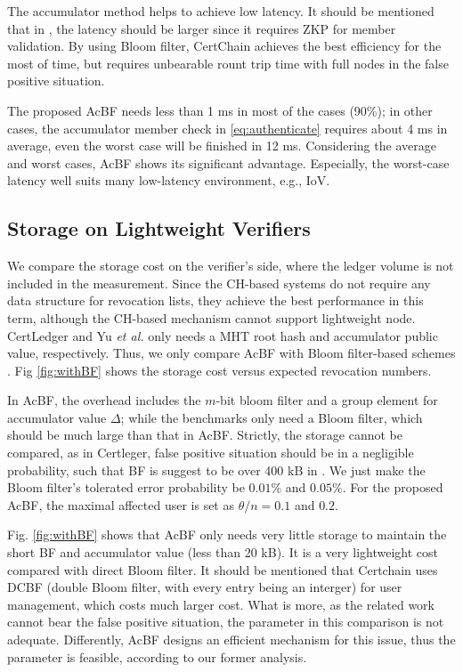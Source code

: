 \documentclass[conference]{IEEEtran}
\begin{document}
The accumulator method helps \cite{yu2019blockchain} to achieve low latency. It should be mentioned that in \cite{yu2019blockchain}, the latency should be larger since it requires ZKP for member validation. By using Bloom filter, CertChain \cite{chenCertchainPublicEfficient2018a} achieves the best efficiency for the most of time, but requires unbearable rount trip time with full nodes in the false positive situation. 

The proposed AcBF needs less than 1 ms in most of the cases (90\%); in other cases, the accumulator member check in \eqref{eq:authenticate} requires about 4 ms in average, even the worst case will be finished in 12 ms. Considering the average and worst cases, AcBF shows its significant advantage. Especially, the worst-case latency well suits many low-latency environment, e.g., IoV.

\subsection{Storage on Lightweight Verifiers}
We compare the storage cost on the verifier's side, where the ledger volume is not included in the measurement. Since the CH-based systems 
\cite{luoScalaCertScalabilityOrientedPKI2022a} do not require any data structure for revocation lists, they achieve the best performance in this term, although the CH-based mechanism cannot support lightweight node. CertLedger \cite{certledger} and Yu \textit{et al.} 
\cite{yu2019blockchain} only needs a MHT root hash and accumulator public value, respectively. Thus, we only compare AcBF with Bloom filter-based schemes \cite{certchain2018, jia2021process}. Fig \ref{fig:withBF} shows the storage cost versus expected revocation numbers. 

In AcBF, the overhead includes the $m$-bit bloom filter and a group element for accumulator value $\Delta$; while the benchmarks only need a Bloom filter, which should be much large than that in AcBF. Strictly, the storage cannot be compared, as in Certleger, false positive situation should be in a negligible probability, such that BF is suggest to be over 400 kB in \cite{certchain2018}. We just make the Bloom filter's tolerated error probability be $0.01\%$ and $0.05\%$. For the proposed AcBF, the maximal affected user is set as $\theta/n = 0.1$ and $0.2$. 

Fig. \ref{fig:withBF} shows that AcBF only needs very little storage to maintain the short BF and accumulator value (less than 20 kB). It is a very lightweight cost compared with direct Bloom filter. It should be mentioned that Certchain uses DCBF (double Bloom filter, with every entry being an interger) for user management, which costs much larger cost. What is more, as the related work cannot bear the false positive situation, the parameter in this comparison is not adequate. Differently, AcBF designs an efficient mechanism for this issue, thus the parameter is feasible, according to our former analysis.
\end{document}
